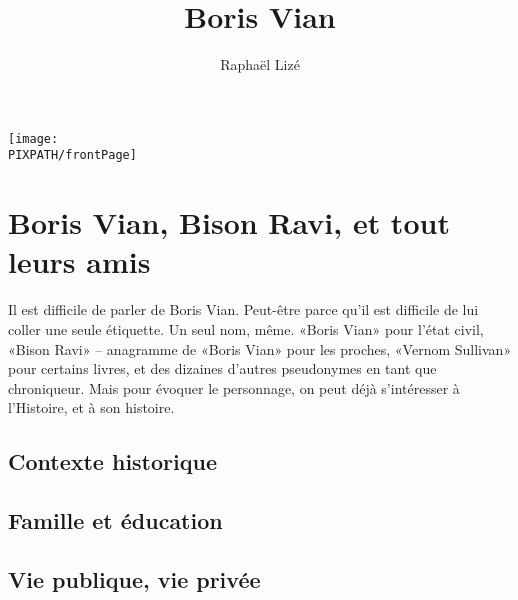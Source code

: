 \documentclass[twoside]{book}
\title{Boris Vian}
\author{Raphaël Lizé}
\newcommand\PIXPATH{./docs/pics}
\begin{document}


\thispagestyle{empty}

\maketitle

\begin{center}
    \texttt{[image: \\PIXPATH/frontPage]}
\end{center}

\vfill
\pagebreak

\tableofcontents
\vfill
\pagebreak



\section{Boris Vian, Bison Ravi, et tout leurs amis}


Il est difficile de parler de Boris Vian. Peut-être parce qu'il
est difficile de lui coller une seule étiquette. Un seul nom,
même. «Boris Vian» pour l'état civil, «Bison Ravi» -- anagramme
de «Boris Vian» pour les proches, «Vernom Sullivan» pour certains
livres, et des dizaines d'autres pseudonymes en tant que chroniqueur.
Mais pour évoquer le personnage, on peut déjà s'intéresser à l'Histoire,
et à son histoire.

\subsection{Contexte historique}


\subsection{Famille et éducation}


\subsection{Vie publique, vie privée}


\end{document}
